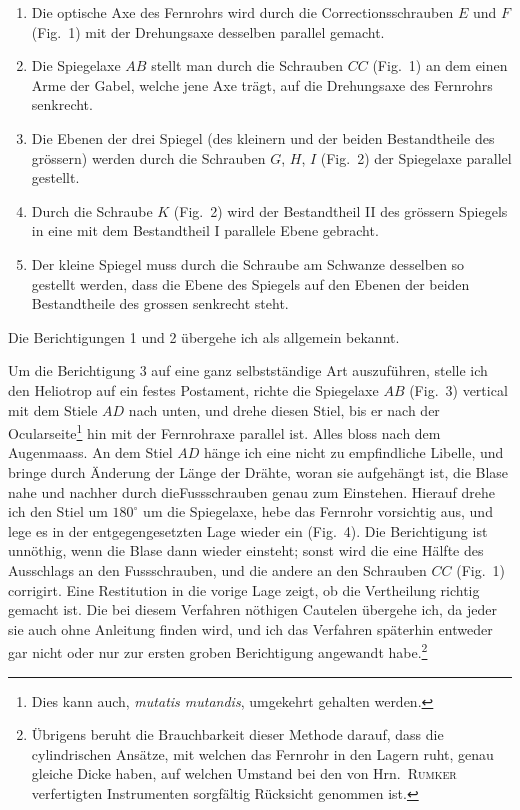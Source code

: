 \documentclass[12pt,a4paper]{article}
\theoremstyle{plain}
\theoremstyle{definition}
\theoremstyle{remark}
\begin{document}
\begin{enumerate}[label=\arabic*.]
\item[1.--2.] Die optische Axe des Fernrohrs wird durch die Correctionsschrauben $E$ und $F$ (Fig.~1) mit der Drehungsaxe desselben parallel gemacht.

\item[3.] Die Spiegelaxe $AB$ stellt man durch die Schrauben $CC$ (Fig.~1) an dem einen Arme der Gabel, welche jene Axe tr\"agt, auf die Drehungsaxe des Fernrohrs senkrecht.

\item[4.--5.--6.] Die Ebenen der drei Spiegel (des kleinern und der beiden Bestandtheile des gr\"ossern) werden durch die Schrauben $G$, $H$, $I$ (Fig.~2) der Spiegelaxe parallel gestellt.

\item[7.] Durch die Schraube $K$ (Fig.~2) wird der Bestandtheil II des gr\"ossern Spiegels in eine mit dem Bestandtheil I parallele Ebene gebracht.

\item[8.] Der kleine Spiegel muss durch die Schraube am Schwanze desselben so gestellt werden, dass die Ebene des Spiegels auf den Ebenen der beiden Bestandtheile des grossen senkrecht steht.
\end{enumerate}

Die Berichtigungen 1 und 2 \"ubergehe ich als allgemein bekannt.

Um die Berichtigung 3 auf eine ganz selbstst\"andige Art auszuf\"uhren, stelle ich den Heliotrop auf ein festes Postament, richte die Spiegelaxe $AB$ (Fig.~3) vertical mit dem Stiele $AD$ nach unten, und drehe diesen Stiel, bis er nach der Ocularseite\footnote{Dies kann auch, \textit{mutatis mutandis}, umgekehrt gehalten werden.} hin mit der Fernrohraxe parallel ist. Alles bloss nach dem Augenmaass. An dem Stiel $AD$ h\"ange ich eine nicht zu empfindliche Libelle, und bringe durch \"Anderung der L\"ange der Dr\"ahte, woran sie aufgeh\"angt ist, die Blase nahe und nachher durch dieFussschrauben genau zum Einstehen. Hierauf drehe ich den Stiel um $180^{\circ}$ um die Spiegelaxe, hebe das Fernrohr vorsichtig aus, und lege es in der entgegengesetzten Lage wieder ein (Fig.~4). Die Berichtigung ist unn\"othig, wenn die Blase dann wieder einsteht; sonst wird die eine H\"alfte des Ausschlags an den Fussschrauben, und die andere an den Schrauben $CC$ (Fig.~1) corrigirt. Eine Restitution in die vorige Lage zeigt, ob die Vertheilung richtig gemacht ist. Die bei diesem Verfahren n\"othigen Cautelen \"ubergehe ich, da jeder sie auch ohne Anleitung finden wird, und ich das Verfahren sp\"aterhin entweder gar nicht oder nur zur ersten groben Berichtigung angewandt habe.\footnote{\"Ubrigens beruht die Brauchbarkeit dieser Methode darauf, dass die cylindrischen Ans\"atze, mit welchen das Fernrohr in den Lagern ruht, genau gleiche Dicke haben, auf welchen Umstand bei den von Hrn.\ \textsc{Rumker} verfertigten Instrumenten sorgf\"altig R\"ucksicht genommen ist.}
\end{document}
